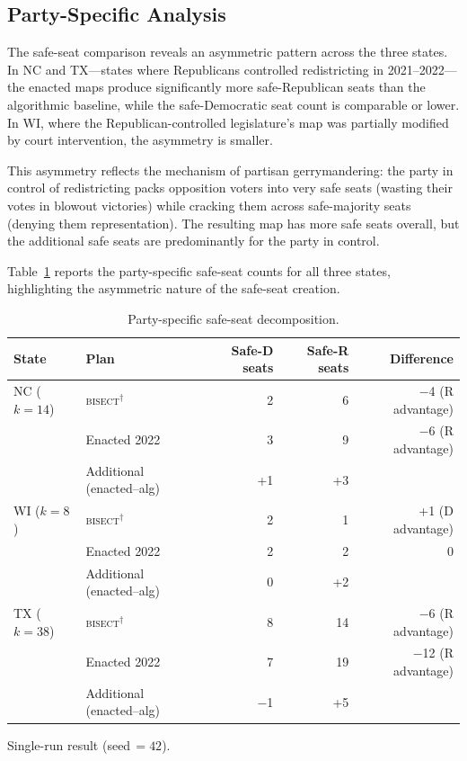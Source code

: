 \label{sec:discussion}

\subsection{Party-Specific Analysis}

The safe-seat comparison reveals an asymmetric pattern across the three states. In NC
and TX---states where Republicans controlled redistricting in 2021--2022---the enacted
maps produce significantly more safe-Republican seats than the algorithmic baseline,
while the safe-Democratic seat count is comparable or lower. In WI, where the
Republican-controlled legislature's map was partially modified by court intervention,
the asymmetry is smaller.

This asymmetry reflects the mechanism of partisan gerrymandering: the party in control
of redistricting packs opposition voters into very safe seats (wasting their votes in
blowout victories) while cracking them across safe-majority seats (denying them
representation). The resulting map has more safe seats overall, but the additional safe
seats are predominantly for the party in control.

Table~\ref{tab:party-decomp} reports the party-specific safe-seat counts for all three
states, highlighting the asymmetric nature of the safe-seat creation.

\begin{table}[ht]
\centering
\begin{threeparttable}
\caption{Party-specific safe-seat decomposition.}
\label{tab:party-decomp}
\begin{tabular}{l l r r r}
\toprule
State & Plan & Safe-D seats & Safe-R seats & Difference \\
\midrule
NC ($k=14$) & \textsc{bisect}$^\dagger$ & 2 & 6 & $-$4 (R advantage) \\
            & Enacted 2022              & 3 & 9 & $-$6 (R advantage) \\
            & Additional (enacted--alg) & +1 & +3 & \\
\addlinespace
WI ($k=8$)  & \textsc{bisect}$^\dagger$ & 2 & 1 & +1 (D advantage) \\
            & Enacted 2022              & 2 & 2 & 0 \\
            & Additional (enacted--alg) & 0 & +2 & \\
\addlinespace
TX ($k=38$) & \textsc{bisect}$^\dagger$ & 8 & 14 & $-$6 (R advantage) \\
            & Enacted 2022              & 7 & 19 & $-$12 (R advantage) \\
            & Additional (enacted--alg) & $-$1 & +5 & \\
\bottomrule
\end{tabular}
\begin{tablenotes}
\small
\item[$\dagger$] Single-run result (seed\,$=42$).
\end{tablenotes}
\end{threeparttable}
\end{table}


